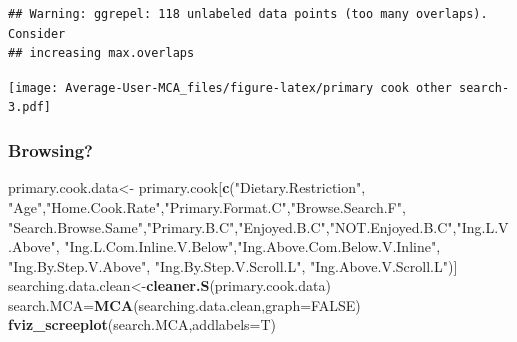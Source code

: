 \documentclass[
]{article}
\newenvironment{Shaded}{\begin{snugshade}}{\end{snugshade}}
\newcommand{\DataTypeTok}[1]{\textcolor[rgb]{0.13,0.29,0.53}{#1}}
\newcommand{\KeywordTok}[1]{\textcolor[rgb]{0.13,0.29,0.53}{\textbf{#1}}}
\newcommand{\NormalTok}[1]{#1}
\newcommand{\OtherTok}[1]{\textcolor[rgb]{0.56,0.35,0.01}{#1}}
\newcommand{\StringTok}[1]{\textcolor[rgb]{0.31,0.60,0.02}{#1}}
\begin{document}
\begin{Shaded}
\end{Shaded}

\begin{verbatim}
## Warning: ggrepel: 118 unlabeled data points (too many overlaps). Consider
## increasing max.overlaps
\end{verbatim}

\texttt{[image: Average-User-MCA\_files/figure-latex/primary cook other search-3.pdf]}

\hypertarget{browsing-3}{%
\subsubsection{Browsing?}\label{browsing-3}}

\begin{Shaded}
\begin{Highlighting}[]
\NormalTok{primary.cook.data<-}\StringTok{ }\NormalTok{primary.cook[}\KeywordTok{c}\NormalTok{(}\StringTok{"Dietary.Restriction"}\NormalTok{, }\StringTok{"Age"}\NormalTok{,}\StringTok{"Home.Cook.Rate"}\NormalTok{,}\StringTok{"Primary.Format.C"}\NormalTok{,}\StringTok{"Browse.Search.F"}\NormalTok{,}
            \StringTok{"Search.Browse.Same"}\NormalTok{,}\StringTok{"Primary.B.C"}\NormalTok{,}\StringTok{"Enjoyed.B.C"}\NormalTok{,}\StringTok{"NOT.Enjoyed.B.C"}\NormalTok{,}\StringTok{"Ing.L.V.Above"}\NormalTok{,}
            \StringTok{"Ing.L.Com.Inline.V.Below"}\NormalTok{,}\StringTok{"Ing.Above.Com.Below.V.Inline"}\NormalTok{,  }\StringTok{"Ing.By.Step.V.Above"}\NormalTok{,  }\StringTok{"Ing.By.Step.V.Scroll.L"}\NormalTok{,}
            \StringTok{"Ing.Above.V.Scroll.L"}\NormalTok{)]}
\NormalTok{searching.data.clean<-}\KeywordTok{cleaner.S}\NormalTok{(primary.cook.data)}
\NormalTok{search.MCA=}\KeywordTok{MCA}\NormalTok{(searching.data.clean,}\DataTypeTok{graph=}\OtherTok{FALSE}\NormalTok{)}
\KeywordTok{fviz_screeplot}\NormalTok{(search.MCA,}\DataTypeTok{addlabels=}\NormalTok{T)}
\end{Highlighting}
\end{Shaded}
\end{document}
